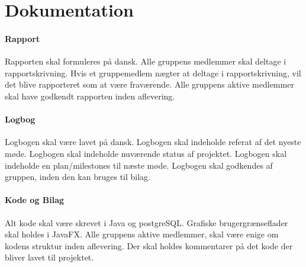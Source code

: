 \section{Dokumentation}

\paragraph{Rapport}
Rapporten skal formuleres på dansk.
Alle gruppens medlemmer skal deltage i rapportskrivning.
Hvis et gruppemedlem nægter at deltage i rapportskrivning, vil det blive rapporteret som at være fraværende.
Alle gruppens aktive medlemmer skal have godkendt rapporten inden aflevering.

\paragraph{Logbog}
Logbogen skal være lavet på dansk.
Logbogen skal indeholde referat af det nyeste møde.
Logbogen skal indeholde nuværende status af projektet.
Logbogen skal indeholde en plan/milestones til næste møde.
Logbogen skal godkendes af gruppen, inden den kan bruges til bilag.

\paragraph{Kode og Bilag}
Alt kode skal være skrevet i Java og postgreSQL.
Grafiske brugergrænseflader skal holdes i JavaFX.
Alle gruppens aktive medlemmer, skal være enige om kodens struktur inden aflevering.
Der skal holdes kommentarer på det kode der bliver lavet til projektet.